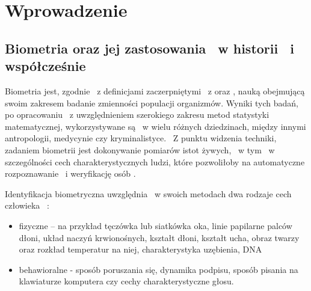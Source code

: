 \chapter{Wprowadzenie}
\label{cha:wprowadzenie}


\section{Biometria oraz jej zastosowania ~w historii ~i współcześnie}
\label{sec:biometria}

Biometria jest, zgodnie ~z definicjami zaczerpniętymi ~z \cite{Ko75} oraz \cite{Bio01}, nauką obejmującą swoim zakresem badanie zmienności populacji organizmów. Wyniki tych badań, po opracowaniu ~z uwzględnieniem szerokiego zakresu metod statystyki matematycznej, wykorzystywane są ~w wielu różnych dziedzinach, między innymi antropologii, medycynie czy kryminalistyce. ~Z punktu widzenia techniki, zadaniem biometrii jest dokonywanie pomiarów istot żywych, ~w tym ~w szczególności cech charakterystycznych ludzi, które pozwoliłoby na automatyczne rozpoznawanie ~i weryfikację osób \cite{Bio01}\cite{Jain00}.

Identyfikacja biometryczna uwzględnia ~w swoich metodach dwa rodzaje cech człowieka ~\cite{Bio01}\cite{Bio02}\cite{Jain00}\cite{Jain08}:
\begin{itemize} 
\item fizyczne – na przykład tęczówka lub siatkówka oka, linie papilarne palców dłoni, układ naczyń krwionośnych, kształt dłoni, kształt ucha, obraz twarzy oraz rozkład temperatur na niej, charakterystyka uzębienia, DNA 
\item behawioralne - sposób poruszania się, dynamika podpisu, sposób pisania na klawiaturze komputera czy cechy charakterystyczne głosu.
\end{itemize}

